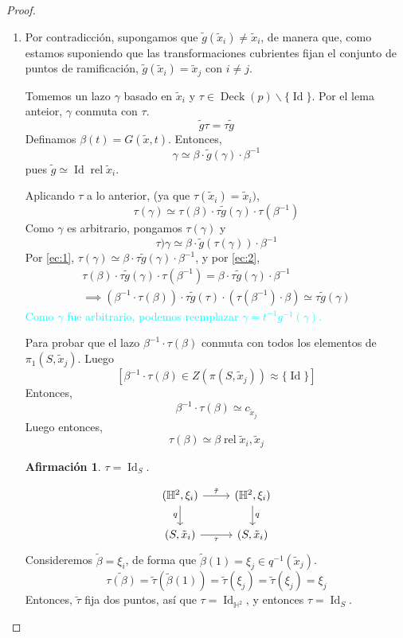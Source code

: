 \documentclass[spanish]{article}
\theoremstyle{definition}
\newtheorem*{af}{Afirmación}
\newcommand{\Hy}{\mathbb{H}}
\DeclareMathOperator{\Id}{Id}
\DeclareMathOperator{\rel}{rel}
\DeclareMathOperator{\Deck}{Deck}
\begin{document}
\begin{proof}\leavevmode
	\begin{enumerate}
		\item Por contradicción, supongamos que $\tilde{g}(\tilde{x}_i)\neq\tilde{x}_i$, de manera que, como estamos suponiendo que las transformaciones cubrientes fijan el conjunto de puntos de ramificación, $\tilde{g}(\tilde{x}_i)=\tilde{x}_j$ con $i\neq j$.
		
		Tomemos un lazo $\gamma$ basado en $\tilde{x}_i$ y $\tau\in\Deck(p)\backslash\{\Id\}$. Por el lema anteior, $\gamma$ conmuta con $\tau$.
		\begin{equation}\label{ec:1}
			\tilde{g}\tau=\tau\tilde{g}
		\end{equation}
		Definamos $\beta(t)=G(\tilde{x},t)$. Entonces,
		\[\gamma\simeq\beta\cdot\tilde{g}(\gamma)\cdot\beta^{-1}\]
		pues $\tilde{g}\simeq\Id\rel\tilde{x}_i$.
		
		Aplicando $\tau$ a lo anterior, (ya que $\tau(\tilde{x}_i)=\tilde{x}_i)$,
		\begin{equation}\label{ec:2}
			\tau(\gamma)\simeq\tau(\beta)\cdot\tau\tilde{g}(\gamma)\cdot\tau(\beta^{-1})
		\end{equation}
		Como $\gamma$ es arbitrario, pongamos $\tau(\gamma)$ y
		\begin{equation}\label{ec:3}
			\tau)\gamma\simeq\beta\cdot\tilde{g}(\tau(\gamma))\cdot\beta^{-1}
		\end{equation}
		Por \eqref{ec:1}, $\tau(\gamma)\simeq\beta\cdot\tau\tilde{g}(\gamma)\cdot\beta^{-1}$, y por \eqref{ec:2},
		\begin{align*}
			\tau(\beta)\cdot\tau\tilde{g}(\gamma)\cdot\tau(\beta^{-1})=\beta\cdot\tau\tilde{g}(\gamma)\cdot\beta^{-1}\\
			\implies (\beta^{-1}\cdot\tau(\beta))\cdot\tau\tilde{g}(\tau)\cdot(\tau(\beta^{-1})\cdot\beta)\simeq\tau\tilde{g}(\gamma)
		\end{align*}
		\textcolor{cyan}{Como $\gamma$ fue arbitrario, podemos reemplazar $\gamma=t^{-1}g^{-1}(\gamma)$.}
		
		Para probar que el lazo $\beta^{-1}\cdot\tau(\beta)$ conmuta con todos los elementos de $\pi_1(S,\tilde{x}_j)$. Luego
		\[[\beta^{-1}\cdot\tau(\beta)\in Z(\pi(S,\tilde{x}_j))\approx\{\Id\}]\]
		Entonces,
		\[\beta^{-1}\cdot\tau(\beta)\simeq c_{\tilde{x}_j}\]
		Luego entonces,
		\[\tau(\beta)\simeq\beta\rel\tilde{x}_i,\tilde{x}_j\]
		\begin{af}
			$\tau=\Id_S$.
		\end{af}
		\[\begin{tikzcd}
			(\Hy^2,\xi_i)\arrow[r,"\tilde{\tau}"]\arrow[d,"q",swap]&(\Hy^2,\xi_i)\arrow[d,"q"]\\
			(S,\tilde{x}_i)\arrow[r,swap,"\tau"]&(S,\tilde{x}_i)
		\end{tikzcd}\]
		Consideremos $\tilde{\beta}=\xi_i$, de forma que $\tilde{\beta}(1)=\xi_j\in q^{-1}(\tilde{x}_j)$.
		\[\widetilde{\tau(\beta)}=\tilde{\tau}(\tilde{\beta}(1))=\tilde{\tau}(\xi_j)=\tilde{\tau}(\xi_j)=\xi_j\]
		Entonces, $\tilde{\tau}$ fija dos puntos, así que $\tau=\Id_{\Hy^2}$, y entonces $\tau=\Id_S$.
		

\end{enumerate}
\end{proof}
\end{document}

